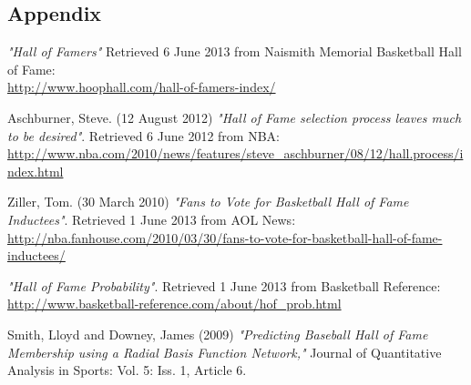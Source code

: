 \documentclass[paper=a4, fontsize=11pt]{scrartcl} %
\numberwithin{equation}{section} %
\numberwithin{figure}{section} %
\numberwithin{table}{section} %
\begin{document}


\begin{appendix}
\section{Appendix}

\end{appendix}

\begin{thebibliography}{9}

	\emph{"Hall of Famers"}
	Retrieved 6 June 2013 from Naismith Memorial Basketball Hall of Fame:\\
	\url{http://www.hoophall.com/hall-of-famers-index/} 

Aschburner, Steve. (12 August 2012)
\emph{"Hall of Fame selection process leaves much to be desired"}.
Retrieved 6 June 2012 from NBA:
\url{http://www.nba.com/2010/news/features/steve_aschburner/08/12/hall.process/index.html}   

   Ziller, Tom. (30 March 2010)
  \emph{"Fans to Vote for Basketball Hall of Fame Inductees"}.
   Retrieved 1 June 2013 from AOL News:
   \url{http://nba.fanhouse.com/2010/03/30/fans-to-vote-for-basketball-hall-of-fame-inductees/}
   
  \emph{"Hall of Fame Probability"}.
   Retrieved 1 June 2013 from Basketball Reference:\\
   \url{http://www.basketball-reference.com/about/hof_prob.html}  
 
Smith, Lloyd and Downey, James (2009)
\emph{"Predicting Baseball Hall of Fame Membership using a Radial Basis Function Network,"}
Journal of Quantitative Analysis in Sports: Vol. 5: Iss. 1, Article 6.
 
\end{thebibliography}
\end{document}
